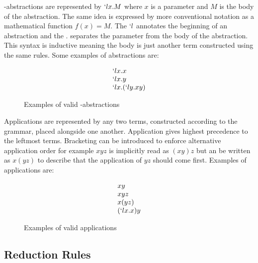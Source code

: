   \begin{figure}[!h]
  \end{figure}

  \lam-abstractions are represented by $`lx.M$ where $x$ is a parameter and 
  $M$ is the body of the abstraction. The same idea is expressed by more
  conventional notation as a mathematical function $f(x) = M$. The $`l$ 
  annotates the beginning of an abstraction and the $.$ separates the parameter 
  from the body of the abstraction. This syntax is inductive meaning the body 
  is just another term constructed using the same rules. Some examples of 
  abstractions are:
  \begin{figure}[!h]
    \[
      \begin{array}{l}
      `lx.x \\
      `lx.y \\
      `lx.(`ly.xy)
      \end{array}
    \]
  \caption{Examples of valid \lam-abstractions}
  \end{figure}
  
  Applications are represented by any two terms, constructed according to
  the grammar, placed alongside one another. Application gives highest
  precedence to the leftmost terms. Bracketing can be introduced to enforce 
  alternative application order for example $xyz$ is implicitly read as 
  $(xy)z$ but an be written as $x(yz)$ to describe that the application of 
  $yz$ should come first. Examples of applications are:
    \begin{figure}[!h]
      \[
        \begin{array}{l}
        xy \\
        xyz \\
        x(yz) \\
        (`lx.x)y
        \end{array}
      \]
    \caption{Examples of valid applications}
    \end{figure}

\subsection{Reduction Rules}


